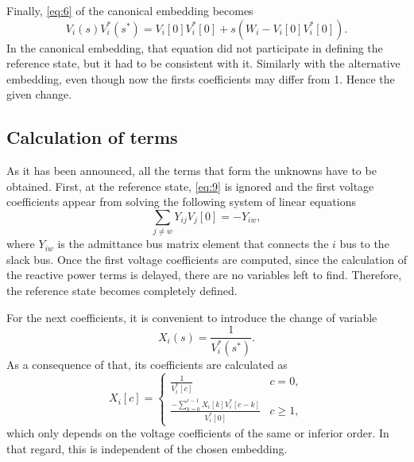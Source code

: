\documentclass[journal]{IEEEtran}
\begin{document}
Finally, \eqref{eq:6} of the canonical embedding becomes
\begin{equation}
  V_i(s)V^*_i(s^*)=V_i[0]V^*_i[0]+s(W_i-V_i[0]V^*_i[0]).\label{eq:9}
\end{equation}
In the canonical embedding, that equation did not participate in defining the reference state, but it had to be consistent with it. Similarly with the alternative embedding, even though now the firsts coefficients may differ from 1. Hence the given change.


\subsection{Calculation of terms} 
As it has been announced, all the terms that form the unknowns have to be obtained. First, at the reference state, \eqref{eq:9} is ignored and the first voltage coefficients appear from solving the following system of linear equations
\begin{equation}
  \sum_{j\neq w}Y_{ij}V_j[0]=-Y_{iw},\label{eq:11}
\end{equation}
where $Y_{iw}$ is the admittance bus matrix element that connects the $i$ bus to the slack bus. Once the first voltage coefficients are computed, since the calculation of the reactive power terms is delayed, there are no variables left to find. Therefore, the reference state becomes completely defined.

For the next coefficients, it is convenient to introduce the change of variable
\begin{equation}
  X_i(s)=\frac{1}{V^*_i(s^*)}.
  \label{eq:12}
\end{equation}
As a consequence of that, its coefficients are calculated as
\begin{equation}
  X_i[c]=
  \begin{cases}
    \frac{1}{V^*_i[c]} & c=0,\\
    \frac{-\sum_{k=0}^{c-1}X_i[k]V^*_i[c-k]}{V^*_i[0]} & c\geq 1,
  \end{cases}
  \label{eq:13}
\end{equation}
which only depends on the voltage coefficients of the same or inferior order. In that regard, this is independent of the chosen embedding.
\end{document}

